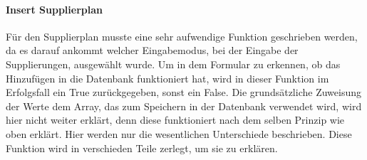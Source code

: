 

\paragraph{Insert Supplierplan\\}
Für den Supplierplan musste eine sehr aufwendige Funktion geschrieben werden, da es darauf ankommt welcher Eingabemodus, bei der Eingabe der Supplierungen, ausgewählt wurde. Um in dem Formular zu erkennen, ob das Hinzufügen in die Datenbank funktioniert hat, wird in dieser Funktion im Erfolgsfall ein True zurückgegeben, sonst ein False. Die grundsätzliche Zuweisung der Werte dem Array, das zum Speichern in der Datenbank verwendet wird, wird hier nicht weiter erklärt, denn diese funktioniert nach dem selben Prinzip wie oben erklärt. Hier werden nur die wesentlichen Unterschiede beschrieben. Diese Funktion wird in verschieden Teile zerlegt, um sie zu erklären.\\
